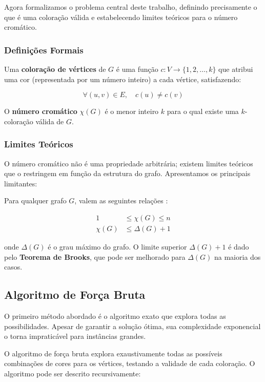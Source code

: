 \documentclass[12pt]{article}
\begin{document}
Agora formalizamos o problema central deste trabalho, definindo precisamente o que é uma coloração válida e estabelecendo limites teóricos para o número cromático.

\subsubsection{Definições Formais}

Uma \textbf{coloração de vértices} de $G$ é uma função $c: V \to \{1, 2, \ldots, k\}$ que atribui uma cor (representada por um número inteiro) a cada vértice, satisfazendo:

\begin{equation}
    \forall (u,v) \in E, \quad c(u) \neq c(v)
\end{equation}

O \textbf{número cromático} $\chi(G)$ é o menor inteiro $k$ para o qual existe uma $k$-coloração válida de $G$. 

\subsubsection{Limites Teóricos}

O número cromático não é uma propriedade arbitrária; existem limites teóricos que o restringem em função da estrutura do grafo. Apresentamos os principais limitantes:

Para qualquer grafo $G$, valem as seguintes relações \cite{feofiloff2011introduccao}:

\begin{align}
    1 &\leq \chi(G) \leq n \\
    \chi(G) &\leq \Delta(G) + 1
\end{align}

onde $\Delta(G)$ é o grau máximo do grafo. O limite superior $\Delta(G) + 1$ é dado pelo \textbf{Teorema de Brooks}, que pode ser melhorado para $\Delta(G)$ na maioria dos casos.

\subsection{Algoritmo de Força Bruta}

O primeiro método abordado é o algoritmo exato que explora todas as possibilidades. Apesar de garantir a solução ótima, sua complexidade exponencial o torna impraticável para instâncias grandes.

O algoritmo de força bruta explora exaustivamente todas as possíveis combinações de cores para os vértices, testando a validade de cada coloração. O algoritmo pode ser descrito recursivamente:
\end{document}
